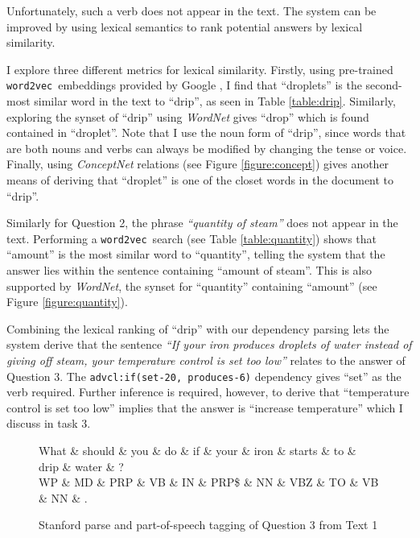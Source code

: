 \documentclass[12pt]{article}
\newcommand{\wordvec}{\texttt{word2vec}}
\begin{document}
Unfortunately, such a verb does not appear in the text. The system can be improved by using lexical semantics \citep{lecture7} to rank potential answers by lexical similarity.

I explore three different metrics for lexical similarity. Firstly, using pre-trained \wordvec~embeddings provided by Google \citep{mikolov2013distributed}, I find that ``droplets'' is the second-most similar word in the text to ``drip'', as seen in Table \ref{table:drip}. Similarly, exploring the synset of ``drip'' using \emph{WordNet} \citep{miller1995wordnet} gives ``drop'' which is found contained in ``droplet''. Note that I use the noun form of ``drip'', since words that are both nouns and verbs can always be modified by changing the tense or voice. Finally, using \emph{ConceptNet} \citep{speer2016conceptnet} relations (see  Figure \ref{figure:concept}) gives another means of deriving that ``droplet'' is one of the closet words in the document to ``drip''. 

Similarly for Question 2, the phrase \emph{``quantity of steam''} does not appear in the text. Performing a \wordvec~search (see Table \ref{table:quantity}) shows that ``amount'' is the most similar word to ``quantity'', telling the system that the answer lies within the sentence containing ``amount of steam''. This is also supported by \emph{WordNet}, the synset for ``quantity'' containing ``amount'' (see Figure \ref{figure:quantity}).

Combining the lexical ranking of ``drip'' with our dependency parsing lets the system derive that the sentence \emph{``If your iron produces droplets of water instead of giving off steam, your temperature control is set too low''} relates to the answer of Question 3. The \texttt{advcl:if(set-20, produces-6)} dependency gives ``set'' as the verb required. Further inference is required, however, to derive that ``temperature control is set too low'' implies that the answer is ``increase temperature'' which I discuss in task 3.

\begin{figure}[H]
\begin{dependency}
   \begin{deptext}[column sep=0.6cm,  row sep=.5ex]
      What \& should \& you \& do \& if \& your \& iron \& starts \& to \& drip \& water \& ? \\
      WP \& MD \& PRP \& VB \& IN \& PRP\$ \& NN \& VBZ \& TO \& VB \& NN \& . \\
   \end{deptext}
\end{dependency}
\caption{Stanford parse and part-of-speech tagging of Question 3 from Text 1}
\label{figure:question3}
\end{figure}
\end{document}
